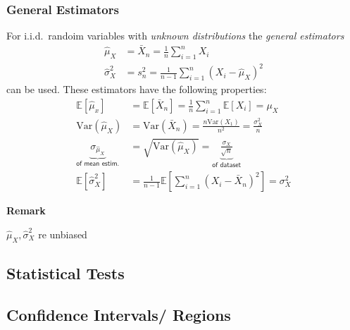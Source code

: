 \subsubsection{General Estimators}
For i.i.d.\ randoim variables with \textit{unknown distributions} the \textit{general estimators}
\noindent\begin{align*}
    \hat{\mu}_{X}    & =\bar{X}_{n}=\frac1n\sum_{i=1}^{n}X_{i}             \\
    \hat{\sigma}_X^2 & =s_n^2=\frac1{n-1}\sum_{i=1}^n{(X_i-\hat{\mu}_X)}^2
\end{align*}
can be used. These estimators have the following properties:
\noindent\begin{align*}
    \mathbb{E}[\hat{\mu}_x]      & =\mathbb{E}[\bar{X}_n]=\frac1n\sum_{i=1}^n\mathbb{E}[X_i]=\mu_X                          \\
    \mathrm{Var}(\hat{\mu}_X)    & =\mathrm{Var}(\bar{X}_n)=\frac{n\mathrm{Var}(X_1)}{n^2}=\frac{\sigma_X^2}n               \\
    \underbrace{\sigma_{\hat{\mu}_{X}}}_{\textsf{of mean estim.}}       & =\sqrt{\mathrm{Var}(\hat{\mu}_{X})}=\underbrace{\frac{\sigma_{X}}{\sqrt{n}}}_{\textsf{of dataset}}                          \\
    \mathbb{E}[\hat{\sigma}_X^2] & =\frac1{n-1}\mathbb{E}\left[\sum_{i=1}^n\left(X_i-\bar{X}_n\right)^2\right] = \sigma^2_X
\end{align*}

\textbf{Remark}

$\hat{\mu}_X, \hat{\sigma}_X^2$ re unbiased

\subsection{Statistical Tests}

\subsection{Confidence Intervals/ Regions}